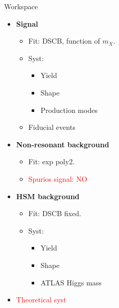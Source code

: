 \documentclass[10pt,UKenglish, leqno, xcolor = dvipsnames]{beamer}
\begin{document}
		\begin{frame}{Workspace}
			\vfill
			\begin{itemize}
				\item \textbf{Signal}
				\begin{itemize}
					\item Fit: DSCB, function of $m_X$.
					\item Syst:
					\begin{itemize}
						\item Yield
						\item Shape
						\item Production modes
					\end{itemize}
					\item Fiducial events
				\end{itemize}
				\item \textbf{Non-resonant background}
				\begin{itemize}
					\item Fit: exp poly2.
					\item \textcolor{red}{Spurios signal: NO}
				\end{itemize}
				
				\item \textbf{HSM background}
				\begin{itemize}
					\item Fit: DSCB fixed.
					\item Syst:
					\begin{itemize}
						\item Yield
						\item Shape
						\item ATLAS Higgs mass
					\end{itemize}
				\end{itemize}
				\item \textcolor{red}{Theoretical syst}
			\end{itemize}
			\vfill
		\end{frame}
		
\end{document}
